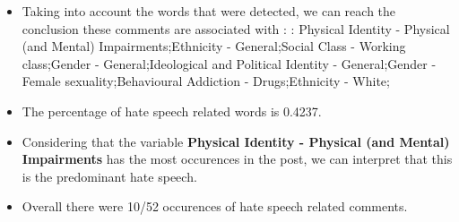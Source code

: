 \documentclass[11pt]{article}
\begin{document}
\begin{itemize}\item Taking into account the words that were detected, we can reach the conclusion these comments are associated with : : Physical Identity - Physical (and Mental) Impairments;Ethnicity - General;Social Class - Working class;Gender - General;Ideological and Political Identity - General;Gender - Female sexuality;Behavioural Addiction - Drugs;Ethnicity - White;%

\item The percentage of hate speech related words is 0.4237.

\item Considering that the variable \textbf{Physical Identity - Physical (and Mental) Impairments} has the most occurences in the post, we can interpret that this is the predominant hate speech.

\item Overall there were 10/52 occurences of hate speech related comments.\end{itemize}
\end{document}
